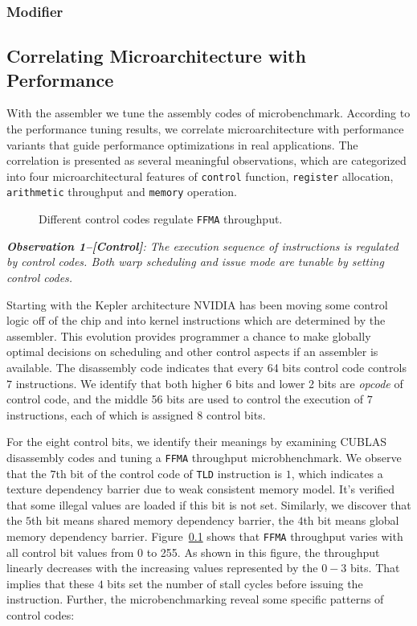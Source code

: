 \documentclass{sig-alternate-05-2015}
\begin{document}
\subsubsection{Modifier}

\subsection{Correlating Microarchitecture with Performance}
With the assembler we tune the assembly codes of microbenchmark. According to the performance tuning results, we correlate microarchitecture with performance variants that guide performance optimizations in real applications. The correlation is presented as several meaningful observations, which are categorized into four microarchitectural features of {\tt control} function, {\tt register} allocation, {\tt arithmetic} throughput and {\tt memory} operation.

\begin{figure}[htbp]
\begin{center}
\caption{Different control codes regulate {\tt FFMA} throughput.}
\label{fig:control}
\end{center}
\end{figure}

{\em {\bf Observation 1--[Control]}: The execution sequence of instructions is regulated by control codes. Both warp scheduling and issue mode are tunable by setting control codes.}

Starting with the Kepler architecture NVIDIA has been moving some control logic off of the chip and into kernel instructions which are determined by the assembler. This evolution provides programmer a chance to make globally optimal decisions on scheduling and other control aspects if an assembler is available. The disassembly code indicates that every 64 bits control code controls $7$ instructions. We identify that both higher $6$ bits and lower 2 bits are {\em opcode} of control code, and the middle 56 bits are used to control the execution of $7$ instructions, each of which is assigned $8$ control bits.

For the eight control bits, we identify their meanings by examining CUBLAS disassembly codes and tuning a {\tt FFMA} throughput microbhenchmark. We observe that the $7$th bit of the control code of {\tt TLD} instruction is $1$, which indicates a texture dependency barrier due to weak consistent memory model. It's verified that some illegal values are loaded if this bit is not set. Similarly, we discover that the $5$th bit means shared memory dependency barrier, the $4$th bit means global memory dependency barrier. Figure~\ref{} shows that {\tt FFMA} throughput varies with all control bit values from 0 to 255. As shown in this figure, the throughput linearly decreases with the increasing values represented by the $0-3$ bits. That implies that these $4$ bits set the number of stall cycles before issuing the instruction. Further, the microbenchmarking reveal some specific patterns of control codes:
\end{document}
